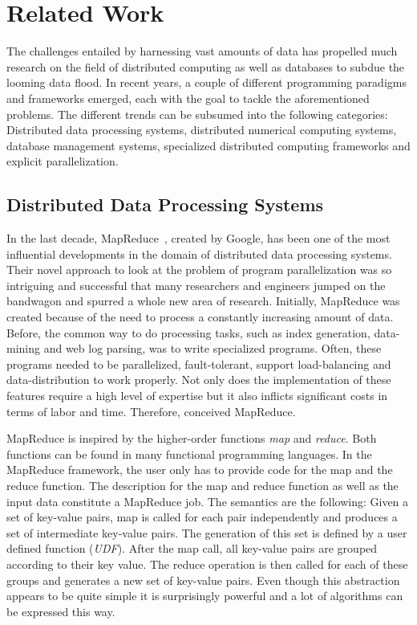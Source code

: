 \section{Related Work}
\label{cha:relatedwork}

The challenges entailed by harnessing vast amounts of data has propelled much research on the field of distributed computing as well as databases to subdue the looming data flood.
In recent years, a couple of different programming paradigms and frameworks emerged, each with the goal to tackle the aforementioned problems.
The different trends can be subsumed into the following categories: Distributed data processing systems, distributed numerical computing systems, database management systems, specialized distributed computing frameworks and explicit parallelization.

\subsection{Distributed Data Processing Systems}

In the last decade, MapReduce~\cite{dean:c2008a}, created by Google, has been one of the most influential developments in the domain of distributed data processing systems.
Their novel approach to look at the problem of program parallelization was so intriguing and successful that many researchers and engineers jumped on the bandwagon and spurred a whole new area of research.
Initially, MapReduce was created because of the need to process a constantly increasing amount of data.
Before, the common way to do processing tasks, such as index generation, data-mining and web log parsing, was to write specialized programs.
Often, these programs needed to be parallelized, fault-tolerant, support load-balancing and data-distribution to work properly.
Not only does the implementation of these features require a high level of expertise but it also inflicts significant costs in terms of labor and time.
Therefore, \cite{dean:c2008a} conceived MapReduce.

MapReduce is inspired by the higher-order functions \emph{map} and \emph{reduce}.
Both functions can be found in many functional programming languages.
In the MapReduce framework, the user only has to provide code for the map and the reduce function.
The description for the map and reduce function as well as the input data constitute a MapReduce job.
The semantics are the following:
Given a set of key-value pairs, map is called for each pair independently and produces a set of intermediate key-value pairs.
The generation of this set is defined by a user defined function (\emph{UDF}).
After the map call, all key-value pairs are grouped according to their key value.
The reduce operation is then called for each of these groups and generates a new set of key-value pairs.
Even though this abstraction appears to be quite simple it is surprisingly powerful and a lot of algorithms can be expressed this way.

